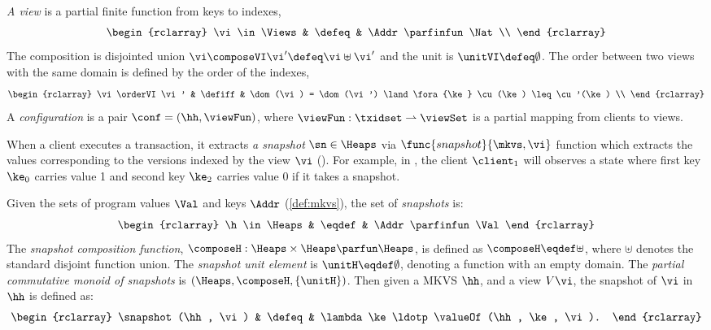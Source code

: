 \begin{definition}
\label{def:view}
\label{def:cuts}
\label{def:views}
\emph{A view} is a partial finite function from keys to indexes,
\[
\begin{rclarray}
    \vi \in \Views & \defeq & \Addr \parfinfun \Nat \\
\end{rclarray}
\]                                                                     
The composition is disjointed union \( \vi \composeVI \vi' \defeq \vi \uplus \vi'\) and the unit is \( \unitVI \defeq \emptyset\).
The order between two views with the same domain is defined by the order of the indexes, 
\[
\begin{rclarray}
    \vi \orderVI \vi' & \defiff & \dom(\vi) = \dom(\vi') \land \fora{\ke} \cu(\ke) \leq \cu'(\ke) \\
\end{rclarray}
\]
A \emph{configuration} is a pair $\conf = (\hh, \viewFun)$, where $\viewFun: \txidset \rightharpoonup \viewSet$ is a partial mapping from clients to views. 
\end{definition}

When a client executes a transaction, it extracts \emph{a snapshot} \( \sn \in \Heaps \) via \( \func{snapshot}{\mkvs, \vi} \) function which extracts the values corresponding to the versions indexed by  the view \( \vi \) ().
For example, in , the client \( \client_1 \) will observes a state where first key $\ke_0$ carries value 1 and second key \( \ke_2 \) carries value $0$ if it takes a snapshot.

\begin{definition}[Snapshots]
\label{def:heaps}
\label{def:snapshot}
Given the sets of program values $\Val$  and keys \( \Addr\)  (\ref{def:mkvs}), the set of \emph{snapshots} is:
\[
\begin{rclarray}
    \h \in \Heaps & \eqdef & \Addr \parfinfun \Val
\end{rclarray}
\]
The \emph{snapshot composition function}, $\composeH: \Heaps \times \Heaps \parfun \Heaps$, is defined as $\composeH \eqdef \uplus$, where $\uplus$ denotes the standard disjoint function union. The \emph{ snapshot unit element} is $\unitH \eqdef \emptyset$, denoting a function with an empty domain.
The \emph{partial commutative monoid of snapshots} is $(\Heaps, \composeH, \{\unitH\})$.
Then given a MKVS $\hh$, and a view $V\vi$, the snapshot of $\vi$ in $\hh$ is defined as:
\[
\begin{rclarray}
    \snapshot(\hh, \vi) & \defeq & \lambda \ke \ldotp \valueOf(\hh, \ke, \vi).
\end{rclarray}
\]
\end{definition}

